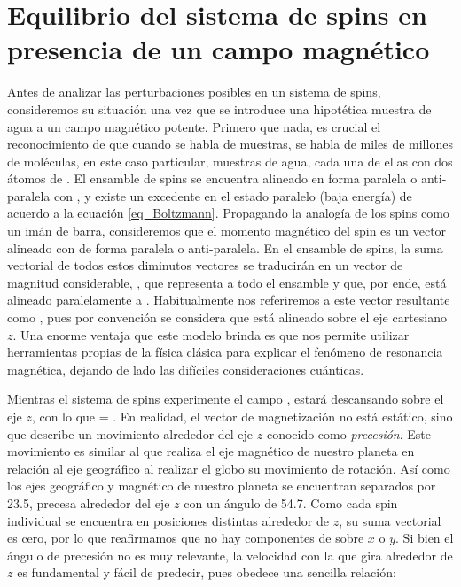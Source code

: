 \section{Equilibrio del sistema de spins en presencia de un campo magnético}
Antes de analizar las perturbaciones posibles en un sistema de spins, consideremos su situación una vez que se introduce una hipotética muestra de agua a un campo magnético potente. Primero que nada, es crucial el reconocimiento de que cuando se habla de muestras, se habla de miles de millones de moléculas, en este caso particular, muestras de agua, cada una de ellas con dos átomos de . El ensamble de spins se encuentra alineado en forma paralela o anti-paralela con \Bzero, y existe un excedente en el estado paralelo (baja energía) de acuerdo a la ecuación \ref{eq_Boltzmann}. Propagando la analogía de los spins como un imán de barra, consideremos que el momento magnético del spin es un vector alineado con \Bzero de forma paralela o anti-paralela. En el ensamble de spins, la suma vectorial de todos estos diminutos vectores se traducirán en un vector de magnitud considerable, \Mzero, que representa a todo el ensamble y que, por ende, está alineado paralelamente a \Bzero. Habitualmente nos referiremos a este vector resultante como \Mz, pues por convención se considera que \Bzero está alineado sobre el eje cartesiano $z$. Una enorme ventaja que este modelo brinda es que nos permite utilizar herramientas propias de la física clásica para explicar el fenómeno de resonancia magnética, dejando de lado las difíciles consideraciones cuánticas.

Mientras el sistema de spins experimente el campo \Bzero, \Mzero estará descansando sobre el eje $z$, con lo que \Mz = \Mzero. En realidad, el vector de magnetización \Mz no está estático, sino que describe un movimiento alrededor del eje $z$ conocido como \emph{precesión}. Este movimiento es similar al que realiza el eje magnético de nuestro planeta en relación al eje geográfico al realizar el globo su movimiento de rotación. Así como los ejes geográfico y magnético de nuestro planeta se encuentran separados por 23.5\degrees, \Mzero precesa alrededor del eje $z$ con un ángulo de 54.7\degrees. Como cada spin individual se encuentra en posiciones distintas alrededor de $z$, su suma vectorial es cero, por lo que reafirmamos que no hay componentes de \Mzero sobre $x$ o $y$. Si bien el ángulo de precesión no es muy relevante, la velocidad con la que \Mz gira alrededor de $z$ es fundamental y fácil de predecir, pues obedece una sencilla relación:

